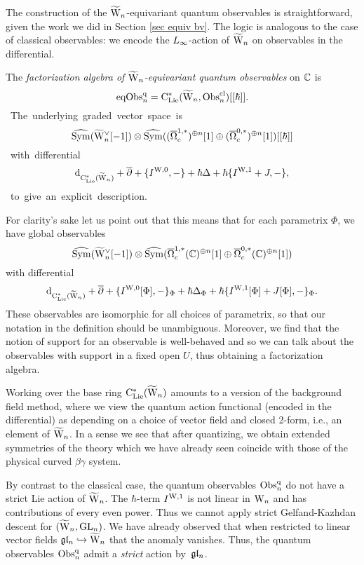 The construction of the $\widetilde{{{\rm W}}}_n$-equivariant quantum observables is straightforward,
given the work we did in Section \ref{sec equiv bv}.
The logic is analogous to the case of classical observables:
we encode the $\L8$-action of $\widetilde{{{\rm W}}}_n$ on observables in the differential.

\begin{dfn}
The \emph{factorization algebra of $\widetilde{{{\rm W}}}_n$-equivariant quantum observables} on $\mathbb C$ is \si 
\[
{\rm eqObs}^{\rm q}_n = {\rm C}_{\rm Lie}^*(\widetilde{{{\rm W}}}_n, {\rm Obs}^{\rm cl}_n)[[\hbar]].
\]
The underlying graded vector space is
\[
\widehat{{\rm Sym}}(\widetilde{{{\rm W}}}_n^\vee[-1]) \otimes \widehat{{\rm Sym}}((\overline{\Omega}^{1,*}_c)^{\oplus n}[1] \oplus (\overline{\Omega}^{0,*}_c)^{\oplus n}[1])[[\hbar]]
\]
with differential 
\[
{\rm d}_{{\rm C}_{\rm Lie}^*(\widetilde{{{\rm W}}}_n)} + \overline{\partial} + \{I^{\rm W,0},-\} + \hbar \Delta + \hbar \{I^{\rm W,1}+J,-\},
\]
to give an explicit description.
\end{dfn}

For clarity's sake let us point out that this means that for each parametrix $\Phi$, we have global observables
\[
\widehat{{\rm Sym}}(\widetilde{{{\rm W}}}_n^\vee[-1]) \otimes \widehat{{\rm Sym}}(\overline{\Omega}^{1,*}_c(\mathbb C)^{\oplus n}[1] \oplus \overline{\Omega}^{0,*}_c(\mathbb C)^{\oplus n}[1])
\]
with differential 
\[
{\rm d}_{{\rm C}_{\rm Lie}^*(\widetilde{{{\rm W}}}_n)} + \overline{\partial} + \{I^{{\rm W},0}[\Phi],-\}_\Phi + \hbar \Delta_\Phi + \hbar \{I^{{\rm W},1}[\Phi]+J[\Phi],-\}_\Phi.
\]
These observables are isomorphic for all choices of parametrix,
so that our notation in the definition should be unambiguous.
Moreover, we find that the notion of support for an observable is well-behaved 
and so we can talk about the observables with support in a fixed open $U$,
thus obtaining a factorization algebra.

\begin{rmk}
Working over the base ring ${\rm C}_{\rm Lie}^*(\widetilde{{{\rm W}}}_n)$ amounts to a version of the background field method,
where we view the quantum action functional (encoded in the differential) as depending on a choice of vector field and closed 2-form,
i.e., an element of $\widetilde{{{\rm W}}}_n$.
In a sense we see that after quantizing, we obtain extended symmetries
of the theory which we have already seen coincide with those of the
physical curved $\beta\gamma$ system.
\end{rmk}

By contrast to the classical case, the quantum observables ${\rm Obs}^{\rm q}_n$ do not have a strict Lie action of $\widetilde{{{\rm W}}}_n$.
The $\hbar$-term $I^{{\rm W},1}$ is not linear in ${{\rm W}_n}$ and has
contributions of every even power.
Thus we cannot apply strict Gelfand-Kazhdan descent for
$(\widetilde{{{\rm W}}}_n,{\rm GL}_n)$. We have already observed that when restricted to
linear vector fields $\mathfrak{g} \mathfrak{l}_n \hookrightarrow \widetilde{{{\rm W}}}_n$ that the anomaly
vanishes. Thus, the quantum observables ${\rm Obs}^{\rm q}_n$ admit a {\it strict} action by~$\mathfrak{g} \mathfrak{l}_n$.


